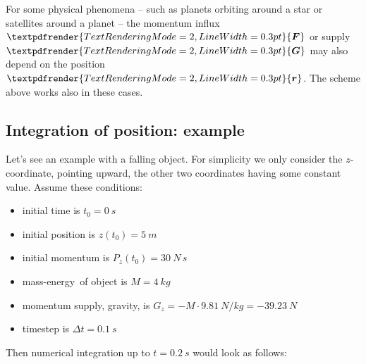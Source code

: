\documentclass[a4paper,12pt,%
onecolumn,oneside,titlepage,%
british%
]{memoir}
\renewcommand*{\bm}[1]{\textpdfrender{TextRenderingMode=2,LineWidth=0.3pt}{\boldsymbol{#1}}}
\newcommand*{\incr}{\Delta}%
\renewcommand*{\|}[1][]{\nonscript\:#1\vert\nonscript\:\mathopen{}}
\newcommand*{\yr}{\bm{r}}
\newcommand*{\yM}{M}%
\newcommand*{\yF}{\bm{F}}
\newcommand*{\yG}{\bm{G}}
\newcommand*{\Dt}{\incr t}
\newcommand*{\masse}{mass-energy}
\begin{document}
For some physical phenomena -- such as planets orbiting around a star or satellites around a planet -- the momentum influx $\yF$ or supply $\yG$ may also depend on the position $\yr$. The scheme above works also in these cases.

\subsection{Integration of position: example}
\label{sec:example_falling_object_timestep}

Let's see an example with a falling object. For simplicity we only consider the $z$-coordinate, pointing upward, the other two coordinates having some constant value. Assume these conditions:
\begin{itemize}\tightlist
\item initial time is $t_{0}=\qty{0}{s}$
\item initial position is $z(t_{0})=\qty{5}{m}$
\item initial momentum is $P_{z}(t_{0})=\qty{30}{N\,s}$
\item \masse\ of object is $\yM=\qty{4}{kg}$
\item momentum supply, gravity, is $G_{z}=-\yM\cdot\qty{9.81}{N/kg} = \qty{-39.23}{N}$
\item timestep is $\Dt = \qty{0.1}{s}$
\end{itemize}
Then numerical integration up to $t=\qty{0.2}{s}$ would look as follows:\noprelistbreak
\end{document}
